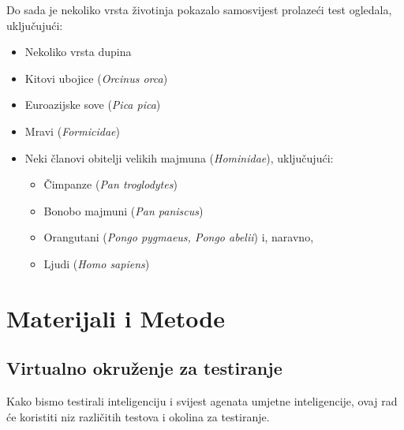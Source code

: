 \documentclass[diplomskirad]{fer}
\begin{document}
Do sada je nekoliko vrsta životinja pokazalo samosvijest prolazeći test ogledala, uključujući:
\begin{itemize}
\item Nekoliko vrsta dupina
\item Kitovi ubojice (\textit{Orcinus orca})
\item Euroazijske sove (\textit{Pica pica})
\item Mravi (\textit{Formicidae})
\item Neki članovi obitelji velikih majmuna (\textit{Hominidae}), uključujući:
\begin{itemize}
\item Čimpanze (\textit{Pan troglodytes})
\item Bonobo majmuni (\textit{Pan paniscus})
\item Orangutani (\textit{Pongo pygmaeus, Pongo abelii})
i, naravno,
\item Ljudi (\textit{Homo sapiens})
\end{itemize}
\end{itemize}



\chapter{Materijali i Metode}
\label{sec:materijaliimetode}
\section{Virtualno okruženje za testiranje}
Kako bismo testirali inteligenciju i svijest agenata umjetne inteligencije, ovaj rad će koristiti niz različitih testova i okolina za testiranje.
\end{document}
